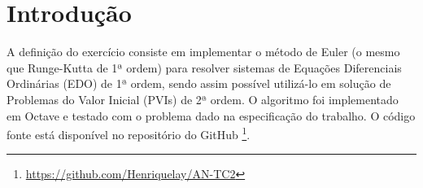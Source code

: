 \section*{Introdução}
A definição do exercício consiste em implementar o método de Euler (o mesmo que Runge-Kutta de 1ª ordem) para resolver sistemas de Equações Diferenciais Ordinárias (EDO) de 1ª ordem, sendo assim possível utilizá-lo em solução de Problemas do Valor Inicial (PVIs) de 2ª ordem. O algoritmo foi implementado em Octave e testado com o problema dado na especificação do trabalho. O código fonte está disponível no repositório do GitHub \footnote{\url{https://github.com/Henriquelay/AN-TC2}}.
